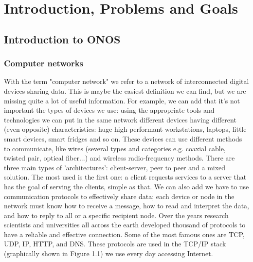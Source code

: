 \documentclass[a4paper,10pt]{memoir}
\begin{document}
\tableofcontents
\cleardoublepage

\mainmatter

\renewcommand\chapterheadstart{}
\renewcommand\printchaptername{}
\renewcommand\chapternamenum{}
\renewcommand\printchapternum{}
\renewcommand\afterchapternum{}
\renewcommand\printchaptertitle[1]{\chaptitlefont \thechapter. \space #1}


\chapter{Introduction, Problems and Goals}

\section{Introduction to ONOS}

\subsection{Computer networks}

With the term "computer network" we refer to a network of interconnected digital devices sharing data. This is maybe the easiest definition we can find, but we are missing quite a lot of useful information. For example, we can add that it's not important the types of devices we use: using the appropriate tools and technologies we can put in the same network different devices having different (even opposite) characteristics: huge high-performant workstations, laptops, little smart devices, smart fridges and so on. These devices can use different methods to communicate, like wires (several types and categories e.g. coaxial cable, twisted pair, optical fiber...) and wireless radio-frequency methods. There are three main types of 'architectures': client-server, peer to peer and a mixed solution. The most used is the first one: a client requests services to a server that has the goal of serving the clients, simple as that. We can also add we have to use communication protocols to effectively share data; each device or node in the network must know how to receive a message, how to read and interpret the data, and how to reply to all or a specific recipient node. Over the years research scientists and universities all across the earth developed thousand of protocols to have a reliable and effective connection. Some of the most famous ones are TCP, UDP, IP, HTTP, and DNS. These protocols are used in the TCP/IP stack (graphically shown in Figure 1.1) we use every day accessing Internet. 
\end{document}
